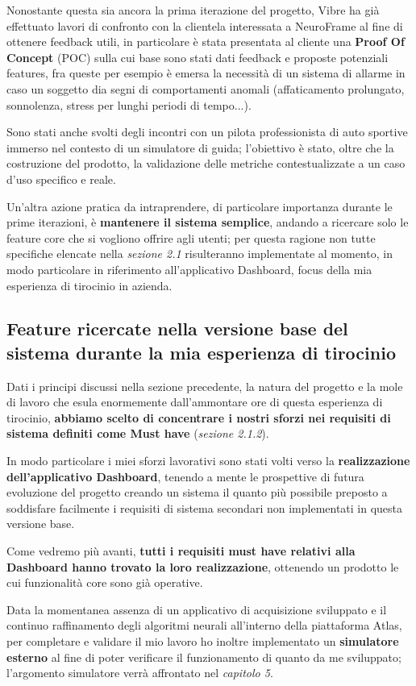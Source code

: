 \noindent Nonostante questa sia ancora la prima iterazione del progetto, Vibre ha già effettuato lavori di confronto con la clientela interessata a NeuroFrame al fine di ottenere feedback utili, in particolare è stata presentata al cliente una {\bf Proof Of Concept} (POC) sulla cui base sono stati dati feedback e proposte potenziali features, fra queste per esempio è emersa la necessità di un sistema di allarme in caso un soggetto dia segni di comportamenti anomali (affaticamento prolungato, sonnolenza, stress per lunghi periodi di tempo...).\newline

\noindent Sono stati anche svolti degli incontri con un pilota professionista di auto sportive immerso nel contesto di un simulatore di guida; l'obiettivo è stato, oltre che la costruzione del prodotto, la validazione delle metriche contestualizzate a un caso d'uso specifico e reale.\newline

\noindent Un'altra azione pratica da intraprendere, di particolare importanza durante le prime iterazioni, è {\bf mantenere il sistema semplice}, andando a ricercare solo le feature core che si vogliono offrire agli utenti; per questa ragione non tutte specifiche elencate nella \emph{sezione 2.1} risulteranno implementate al momento, in modo particolare in riferimento all'applicativo Dashboard, focus della mia esperienza di tirocinio in azienda.

\vspace{5mm}

\subsection{Feature ricercate nella versione base del sistema durante la mia esperienza di tirocinio}
Dati i principi discussi nella sezione precedente, la natura del progetto e la mole di lavoro che esula enormemente dall'ammontare ore di questa esperienza di tirocinio, {\bf abbiamo scelto di concentrare i nostri sforzi nei requisiti di sistema definiti come Must have} (\emph{sezione 2.1.2}).\newline

\noindent In modo particolare i miei sforzi lavorativi sono stati volti verso la {\bf realizzazione dell'applicativo Dashboard}, tenendo a mente le prospettive di futura evoluzione del progetto creando un sistema il quanto più possibile preposto a soddisfare facilmente i requisiti di sistema secondari non implementati in questa versione base.\newline

\noindent Come vedremo più avanti, {\bf tutti i requisiti must have relativi alla Dashboard hanno trovato la loro realizzazione}, ottenendo un prodotto le cui funzionalità core sono già operative.\newline

\noindent Data la momentanea assenza di un applicativo di acquisizione sviluppato e il continuo raffinamento degli algoritmi neurali all'interno della piattaforma Atlas, per completare e validare il mio lavoro ho inoltre implementato un {\bf simulatore esterno} al fine di poter verificare il funzionamento di quanto da me sviluppato; l'argomento simulatore verrà affrontato nel \emph{capitolo 5}.
